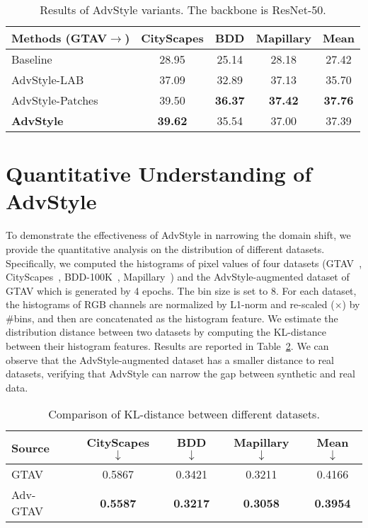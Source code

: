 \documentclass{article}
\newcommand{\ours}{AdvStyle\xspace}
\begin{document}
\begin{table}[t]
\centering
\footnotesize
\caption{Results of \ours variants. The backbone is ResNet-50.}
\setlength{\tabcolsep}{3pt}
\begin{tabular}{l|c|c|c|c}
\toprule
Methods (GTAV$\rightarrow$) & \multicolumn{1}{c|}{CityScapes} & \multicolumn{1}{c|}{BDD} & \multicolumn{1}{c|}{Mapillary} & \multicolumn{1}{c}{Mean}\\
\midrule
{\cellcolor[gray]{1}}Baseline~\cite{robustnet} & 28.95  & 25.14 & 28.18  & 27.42\\
{\cellcolor[gray]{1}}{AdvStyle-LAB} & 37.09 &  32.89 & 37.13 & 35.70 \\
{\cellcolor[gray]{1}}{AdvStyle-Patches} & 39.50 & \bf 36.37 & \bf 37.42 & \bf 37.76 \\
\midrule
{\cellcolor[gray]{1}}\textbf{AdvStyle} &\bf 39.62 & 35.54 & 37.00 & 37.39 \\
\bottomrule
\end{tabular}
\label{table:variants}
\end{table}


\section{Quantitative Understanding of \ours} 

To demonstrate the effectiveness of \ours in narrowing the domain shift, we provide the quantitative analysis on the distribution of different datasets. Specifically, we computed the histograms of pixel values of four datasets (GTAV~\cite{gtav}, CityScapes~\cite{CityScapes}, BDD-100K~\cite{bdd}, Mapillary~\cite{mapillary}) and the AdvStyle-augmented dataset of GTAV which is generated by 4 epochs. The bin size is set to 8. For each dataset, the histograms of RGB channels are normalized by L1-norm and re-scaled ($\times$) by $\#$bins, and then are concatenated as the histogram feature. We estimate the distribution distance between two datasets by computing the KL-distance between their histogram features. Results are reported in Table~\ref{table:kl}.
We can observe that the AdvStyle-augmented dataset has a smaller distance to real datasets, verifying that \ours can narrow the gap between synthetic and real data. 
\begin{table}[!ht]
\centering
\footnotesize
\caption{Comparison of KL-distance between different datasets.}
\setlength{\tabcolsep}{3pt}
\begin{tabular}{l|c|c|c|c}
\toprule
Source & CityScapes $\downarrow$ & BDD $\downarrow$ & Mapillary $\downarrow$ & Mean $\downarrow$ \\
\midrule
GTAV & 0.5867 & 0.3421 & 0.3211 & 0.4166 \\
Adv-GTAV & \bf 0.5587 & \bf 0.3217 & \bf 0.3058 & \bf 0.3954  \\
\bottomrule
\end{tabular}
\label{table:kl}
\end{table}
\end{document}
